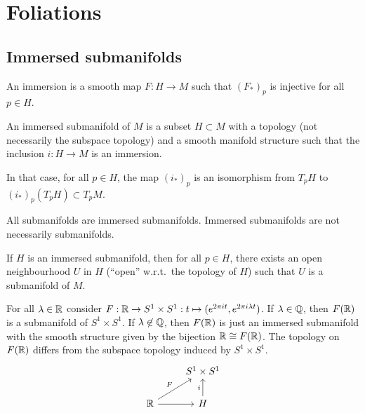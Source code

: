 \setcounter{chapter}{7}
\chapter{Foliations}

\section{Immersed submanifolds}
\begin{definition}[Immersion]
    An immersion is a smooth map $F: H \to  M$ such that $(F_*)_p$ is injective for all  $p \in H$.
\end{definition}
\begin{definition}
    An immersed submanifold of $M$ is a subset $H \subset M$ with a topology (not necessarily the subspace topology) and a smooth manifold structure such that the inclusion $i\colon H\to M$ is an immersion.
\end{definition}
\begin{remark}
   In that case, for all $p\in H$, the map $(i_*)_p$ is an isomorphism from $T_pH$ to $(i_*)_p(T_pH)\subset T_pM$.
   \end{remark}
\begin{remark}
    All submanifolds are immersed submanifolds.
    Immersed submanifolds are not necessarily submanifolds.
\end{remark}
\begin{remark}
    If $H$ is an immersed submanifold, then for all $p \in H$, there exists an open neighbourhood $U$ in $H$ (``open'' w.r.t.\ the topology of $H$) such that $U$ is a submanifold of $M$.
\end{remark}
\begin{eg}
    For all $\lambda \in \mathbb{R}$ consider $F: \mathbb{R} \to  S^{1} \times S^{1}: t \mapsto  (e^{2 \pi i t}, e^{2 \pi i \lambda t})$.
    If $\lambda \in \mathbb{Q}$, then $F(\mathbb{R})$ is a submanifold of $S^{1} \times S^{1}$.
    If $\lambda \not\in \mathbb{Q}$, then $F(\mathbb{R})$ is just an immersed submanifold with the smooth structure given by the bijection $\mathbb{R} \cong F(\mathbb{R})$. The topology on 
    $F(\mathbb{R})$ differs from the subspace topology induced by $S^{1} \times S^{1}$.
    \[
        \begin{tikzcd}
            & S^1 \times S^1\\
            \R \arrow[ur, "F"] \arrow[r, ""] &H \arrow[u, "i"]
        \end{tikzcd}
    \]
\end{eg}
\filbreak

